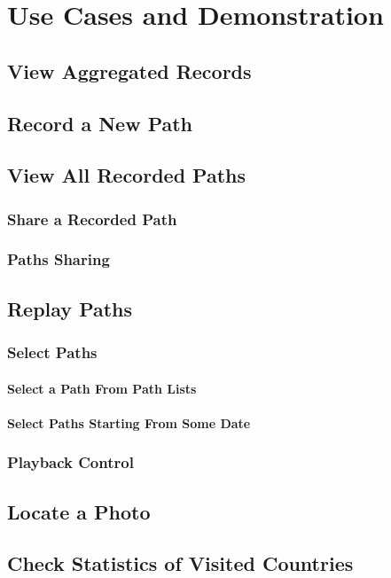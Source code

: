 \documentclass[12pt,a4paper]{article}
\begin{document}
    
    \section{Use Cases and Demonstration}
        \subsection{View Aggregated Records} %
        \subsection{Record a New Path} %
        \subsection{View All Recorded Paths} %
            \subsubsection{Share a Recorded Path}
            \subsubsection{Paths Sharing}
        \subsection{Replay Paths} %
            \subsubsection{Select Paths}
                \paragraph{Select a Path From Path Lists}
                \paragraph{Select Paths Starting From Some Date}
            \subsubsection{Playback Control}
        \subsection{Locate a Photo} %
        \subsection{Check Statistics of Visited Countries} %
    \clearpage    
    
\end{document}
